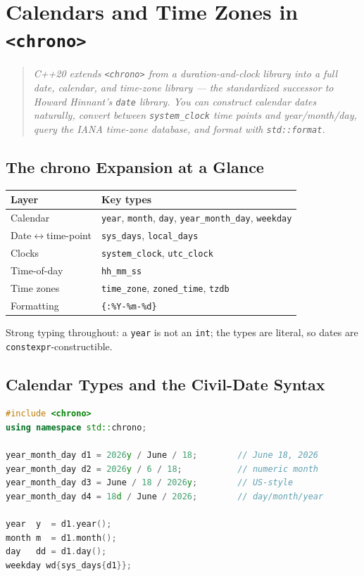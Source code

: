 \chapter{Calendars and Time Zones in \texttt{<chrono>}}
\label{ch:c20-chrono-calendar}

\begin{quote}
\emph{C++20 extends \texttt{<chrono>} from a duration-and-clock library into a full date, calendar, and time-zone library --- the standardized successor to Howard Hinnant's \texttt{date} library. You can construct calendar dates naturally, convert between \texttt{system\_clock} time points and year/month/day, query the IANA time-zone database, and format with \texttt{std::format}.}
\end{quote}

\section{The chrono Expansion at a Glance}
\label{sec:c20-chrono-overview}

\begin{center}
\begin{tabular}{ll}
\hline
\textbf{Layer} & \textbf{Key types} \\
\hline
Calendar & \texttt{year}, \texttt{month}, \texttt{day}, \texttt{year\_month\_day}, \texttt{weekday} \\
Date$\leftrightarrow$time-point & \texttt{sys\_days}, \texttt{local\_days} \\
Clocks & \texttt{system\_clock}, \texttt{utc\_clock} \\
Time-of-day & \texttt{hh\_mm\_ss} \\
Time zones & \texttt{time\_zone}, \texttt{zoned\_time}, \texttt{tzdb} \\
Formatting & \texttt{\{:\%Y-\%m-\%d\}} \\
\hline
\end{tabular}
\end{center}

Strong typing throughout: a \texttt{year} is not an \texttt{int}; the types are literal, so dates are \texttt{constexpr}-constructible.

\section{Calendar Types and the Civil-Date Syntax}
\label{sec:c20-civil-dates}

\begin{lstlisting}[language=C++,caption={Constructing civil dates with the / syntax}]
#include <chrono>
using namespace std::chrono;

year_month_day d1 = 2026y / June / 18;        // June 18, 2026
year_month_day d2 = 2026y / 6 / 18;           // numeric month
year_month_day d3 = June / 18 / 2026y;        // US-style
year_month_day d4 = 18d / June / 2026;        // day/month/year

year  y  = d1.year();
month m  = d1.month();
day   dd = d1.day();
weekday wd{sys_days{d1}};
\end{lstlisting}

